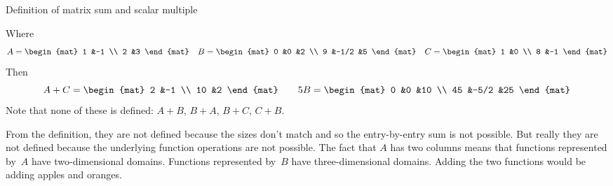 \begin{frame}{Definition of matrix sum and scalar multiple}

\pause
\ex
Where
\begin{equation*}
  A=
  \begin{mat}
    1  &-1 \\
    2  &3
  \end{mat}
  \quad
  B=
  \begin{mat}
    0  &0     &2  \\
    9  &-1/2  &5
  \end{mat}
  \quad
  C=
  \begin{mat}
    1  &0 \\
    8  &-1
  \end{mat}
\end{equation*}
Then
\begin{equation*}
  A+C=
  \begin{mat}
    2  &-1  \\
    10 &2
  \end{mat}
  \qquad
  5B=
  \begin{mat}
    0  &0    &10 \\
    45 &-5/2 &25 
  \end{mat}
\end{equation*}
Note that none of these is defined: $A+B$, $B+A$, 
$B+C$, $C+B$.

From the definition, they are not defined 
because the sizes don't match and so
the entry-by-entry sum is not possible.
But really they are not defined because the underlying function operations
are not possible.
The fact that $A$ has two columns means that
functions represented by~$A$ have two-dimensional domains.
Functions represented by~$B$ have three-dimensional domains.
Adding the two functions would be adding apples and oranges.
\end{frame}




